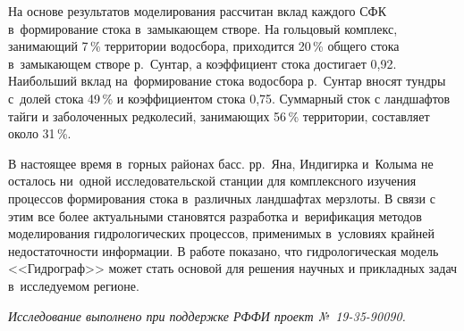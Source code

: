 На основе результатов моделирования рассчитан вклад каждого СФК в~формирование стока в~замыкающем створе. На гольцовый комплекс, занимающий 7\,\% территории водосбора, приходится 20\,\% общего стока в~замыкающем створе р.~Сунтар, а коэффициент стока достигает 0,92. Наибольший вклад на~формирование стока водосбора р.~Сунтар вносят тундры с~долей стока 49\,\% и коэффициентом стока 0,75. Суммарный сток с ландшафтов тайги и заболоченных редколесий, занимающих 56\,\% территории, составляет около 31\,\%.

В настоящее время в~горных районах басс. рр.~Яна, Индигирка и~Колыма не осталось ни~одной исследовательской станции для комплексного изучения процессов формирования стока в~различных ландшафтах мерзлоты. В связи с этим все более актуальными становятся разработка и~верификация методов моделирования гидрологических процессов, применимых в~условиях крайней недостаточности информации. В работе показано, что гидрологическая модель <<Гидрограф>> может стать основой для решения научных и прикладных задач в~исследуемом регионе.

\textit{Исследование выполнено при поддержке РФФИ проект №~19-35-90090.}

